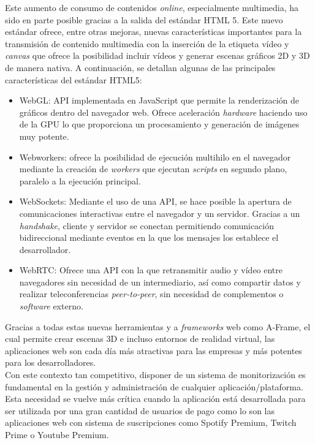 \documentclass[a4paper, 12pt]{book}
\begin{document}
		Este aumento de consumo de contenidos \textit{online}, especialmente multimedia, ha sido en parte posible gracias a la salida del estándar HTML 5. Este nuevo estándar ofrece, entre otras mejoras, nuevas características importantes para la transmisión de contenido multimedia con la inserción de la etiqueta vídeo y \textit{canvas} que ofrece la posibilidad incluir vídeos y generar escenas gráficos 2D y 3D de manera nativa. A continuación, se detallan algunas de las principales características del estándar HTML5:
		
		\begin{itemize}
			\item WebGL: API implementada en JavaScript que permite la renderización de gráficos dentro del navegador web. Ofrece aceleración \textit{hardware} haciendo uso de la GPU lo que proporciona un procesamiento y generación de imágenes muy potente.
			\item Webworkers: ofrece la posibilidad de ejecución multihilo en el navegador mediante la creación de \textit{workers} que ejecutan \textit{scripts} en segundo plano, paralelo a la ejecución principal.
			\item WebSockets: Mediante el uso de una API, se hace posible la apertura de comunicaciones interactivas entre el navegador y un servidor. Gracias a un \textit{handshake}, cliente y servidor se conectan permitiendo comunicación bidireccional mediante eventos en la que los mensajes los establece el desarrollador.
			\item WebRTC: Ofrece una API con la que retransmitir audio y vídeo entre navegadores sin necesidad de un intermediario, así como compartir datos y realizar teleconferencias \textit{peer-to-peer}, sin necesidad de complementos o \textit{software} externo.
		\end{itemize}
	
		Gracias a todas estas nuevas herramientas y a \textit{frameworks} web como A-Frame, el cual permite crear escenas 3D e incluso entornos de realidad virtual, las aplicaciones web son cada día más atractivas para las empresas y más potentes para los desarrolladores. \\		
			
			
		Con este contexto tan competitivo, disponer de un sistema de monitorización es fundamental en la gestión y administración de cualquier aplicación/plataforma. Esta necesidad se vuelve más crítica cuando la aplicación está desarrollada para ser utilizada por una gran cantidad de usuarios de pago como lo son las aplicaciones web con sistema de suscripciones como Spotify Premium, Twitch Prime o Youtube Premium. \\
		
\end{document}
